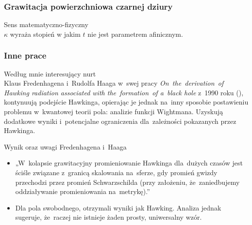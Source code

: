 \documentclass[10pt,t]{beamer}
\begin{document}
\begin{frame}
  \frametitle{Grawitacja powierzchniowa czarnej dziury}


  Sens matematyczno-fizyczny \\
  $\kappa$ wyraża stopień w jakim $t$ nie jest parametrem
  afinicznym.

\end{frame}





\begin{frame}
  \frametitle{Inne prace}


  Według mnie interesujący nurt \\
  Klaus Fredenhagena i~Rudolfa Haaga w~swej pracy
  \textit{On~the~derivation~of Hawking radiation associated with
    the~formation~of a~black hole} z~1990 roku
  (\cite{FredenhagenHaagDerivationOfHawkingRadiation1990}),
  kontynuują podejście Hawkinga, opierając je jednak na~inny
  sposobie postawieniu problemu w~kwantowej teorii pola: analizie
  funkcji Wightmana. Uzyskują dodatkowe wyniki i~potencjalne
  ograniczenia dla~zależności pokazanych przez Hawkinga.

  Wynik oraz uwagi Fredenhagena i~Haaga
  \begin{itemize}
    \RaggedRight

  \item „W~kolapsie grawitacyjny promieniowanie Hawkinga dla~dużych
    czasów jest ściśle związane z~granicą skalowania na~sferze, gdy
    promień gwizdy przechodzi przez promień Schwarzschilda (przy
    założeniu, że~zaniedbujemy oddziaływanie promieniowania
    na~metrykę).”

  \item Dla pola swobodnego, otrzymali wyniki jak Hawking. Analiza
    jednak sugeruje, że~raczej nie istnieje żaden prosty,
    uniwersalny wzór.

  \end{itemize}

\end{frame}
\end{document}
